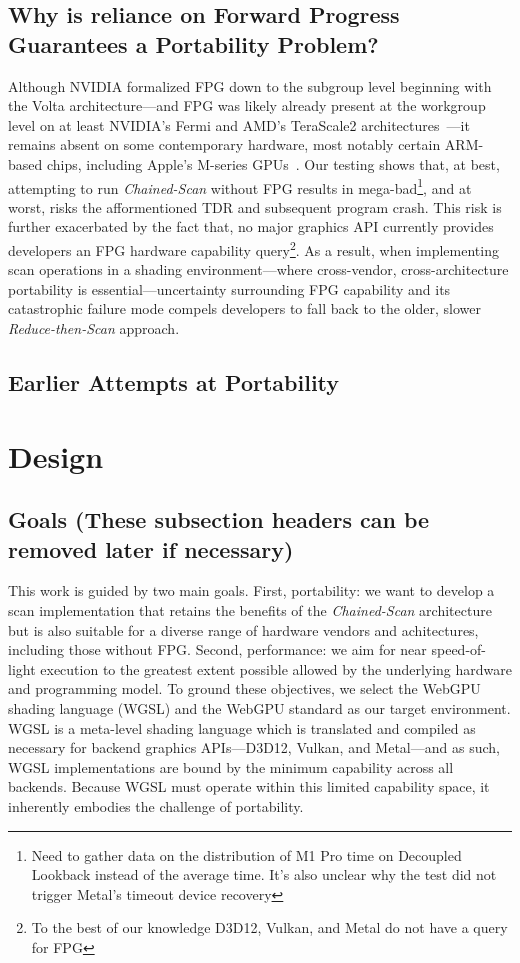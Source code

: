 \documentclass[sigconf]{acmart}
\begin{document}
\subsection{Why is reliance on Forward Progress Guarantees a Portability Problem?}
Although NVIDIA formalized FPG down to the subgroup level beginning with the Volta architecture---and FPG was likely already present at the workgroup level on at least NVIDIA's Fermi and AMD's TeraScale2 architectures~\cite{}---it remains absent on some contemporary hardware, most notably certain ARM-based chips, including Apple's M-series GPUs~\cite{10.1145/3485508}. Our testing shows that, at best, attempting to run \emph{Chained-Scan} without FPG results in mega-bad\footnote{Need to gather data on the distribution of M1 Pro time on Decoupled Lookback instead of the average time. It's also unclear why the test did not trigger Metal's timeout device recovery}, and at worst, risks the afformentioned TDR and subsequent program crash. This risk is further exacerbated by the fact that, no major graphics API currently provides developers an FPG hardware capability query\footnote{To the best of our knowledge D3D12, Vulkan, and Metal do not have a query for FPG}. As a result, when implementing scan operations in a shading environment—where cross-vendor, cross-architecture portability is essential—uncertainty surrounding FPG capability and its catastrophic failure mode compels developers to fall back to the older, slower \emph{Reduce-then-Scan} approach.

\subsection{Earlier Attempts at Portability}

\section{Design}
\subsection{Goals (These subsection headers can be removed later if necessary)}
This work is guided by two main goals. First, portability: we want to develop a scan implementation that retains the benefits of the \emph{Chained-Scan} architecture but is also suitable for a diverse range of hardware vendors and achitectures, including those without FPG. Second, performance: we aim for near speed-of-light execution to the greatest extent possible allowed by the underlying hardware and programming model. To ground these objectives, we select the WebGPU shading language (WGSL) and the WebGPU standard as our target environment. WGSL is a meta-level shading language which is translated and compiled as necessary for backend graphics APIs---D3D12, Vulkan, and Metal---and as such, WGSL implementations are bound by the minimum capability across all backends. Because WGSL must operate within this limited capability space, it inherently embodies the challenge of portability.
\end{document}
